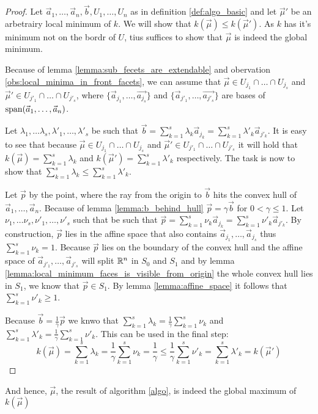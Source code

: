 \begin{proof}
    Let $\vec a_1, \dots, \vec a_n, \vec b, U_1, \dots, U_n$ as in definition \ref{def:algo_basic} and let $\vec\mu'$ be an arbetrairy local minimum of $k$. We will show that $k(\vec\mu) \leq k(\vec\mu')$. As $k$ has it's minimum not on the bordr of $U$, tius suffices to show that $\vec\mu$ is indeed the global minimum.

    Because of lemma \ref{lemma:sub_fecets_are_extendable} and obervation \ref{obs:local_minima_in_front_facets}, we can assume that $\vec\mu \in U_{j_1} \cap \dots \cap U_{j_s}$ and $\vec\mu' \in U_{j'_1} \cap \dots \cap U_{j'_s}$, where $\{\vec a_{j_1}, \dots, \vec {a_{j_s}}\}$ and $\{\vec a_{j'_1}, \dots, \vec {a_{j'_s}}\}$ are bases of $\operatorname{span}(\vec a_1, \dots, \vec a_n)$.
    
    Let $\lambda_1, \dots \lambda_s, \lambda'_1, \dots, \lambda'_s$ be such that $\vec b = \sum_{k=1}^{s}\lambda_k \vec a_{j_k} = \sum_{k=1}^{s}\lambda'_k \vec a_{j'_k}$. It is easy to see that because $\vec\mu \in U_{j_1} \cap \dots \cap U_{j_s}$ and $\vec\mu' \in U_{j'_1} \cap \dots \cap U_{j'_s}$ it will hold that $k(\vec\mu) = \sum_{k=1}^{s}\lambda_k$ and $k(\vec\mu') = \sum_{k=1}^{s}\lambda'_k$ respectively. The task is now to show that $\sum_{k=1}^{s}\lambda_k \leq \sum_{k=1}^{s}\lambda'_k$.

    Let $\vec p$ by the point, where the ray from the origin to $\vec b$ hits the convex hull of $\vec a_1, \dots, \vec a_n$. Because of lemma \ref{lemma:b_behind_hull} $\vec p = \gamma\vec b$ for $0 < \gamma \leq 1$. Let $\nu_1, \dots \nu_s, \nu'_1, \dots, \nu'_s$ such that be such that $\vec p = \sum_{k=1}^{s}\nu_k \vec a_{j_k} = \sum_{k=1}^{s}\nu'_k \vec a_{j'_k}$. By construction, $\vec p$ lies in the affine space that also contains $\vec a_{j_1}, \dots, \vec a_{j_s}$ thus $\sum_{k=1}^{s}\nu_k = 1$. Because $\vec p$ lies on the boundary of the convex hull and the affine space of $\vec a_{j'_1}, \dots, \vec a_{j'_s}$ will split $\mathbb{R}^n$ in $S_0$ and $S_1$ and by lemma \ref{lemma:local_minimum_faces_is_visible_from_origin} the whole convex hull lies in $S_1$, we know that $\vec p\in S_1$. By lemma \ref{lemma:affine_space} it follows that $\sum_{k=1}^{s}\nu'_k \geq 1$.

    Because $\vec b = \frac{1}{\gamma}\vec p$ we knwo that $\sum_{k=1}^{s}\lambda_k = \frac{1}{\gamma} \sum_{k=1}^{s}\nu_k$ and $\sum_{k=1}^{s}\lambda'_k = \frac{1}{\gamma} \sum_{k=1}^{s}\nu'_k$. This can be used in the final step:
    $$k(\vec\mu) = \sum_{k=1}^{s}\lambda_k = \frac{1}{\gamma} \sum_{k=1}^{s}\nu_k = \frac{1}{\gamma} \leq \frac{1}{\gamma} \sum_{k=1}^{s}\nu'_k = \sum_{k=1}^{s}\lambda'_k = k(\vec\mu')$$
\end{proof}
And hence, $\vec\mu$, the result of algorithm \ref{algo}, is indeed the global maximum of $k(\vec\mu)$

